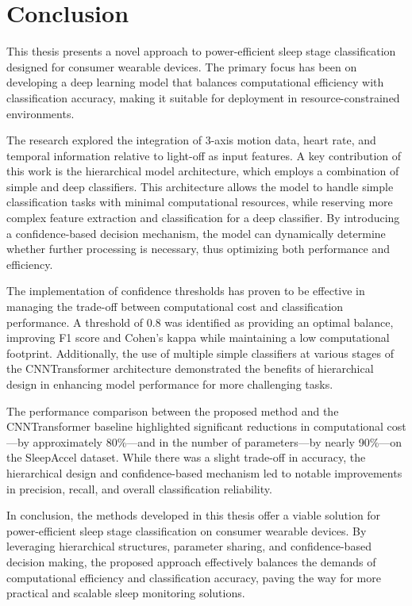 \chapter{Conclusion}

\hspace{2em}This thesis presents a novel approach to power-efficient sleep stage classification designed for consumer wearable devices. The primary focus has been on developing a deep learning model that balances computational efficiency with classification accuracy, making it suitable for deployment in resource-constrained environments.

The research explored the integration of 3-axis motion data, heart rate, and temporal information relative to light-off as input features. A key contribution of this work is the hierarchical model architecture, which employs a combination of simple and deep classifiers. This architecture allows the model to handle simple classification tasks with minimal computational resources, while reserving more complex feature extraction and classification for a deep classifier. By introducing a confidence-based decision mechanism, the model can dynamically determine whether further processing is necessary, thus optimizing both performance and efficiency.

The implementation of confidence thresholds has proven to be effective in managing the trade-off between computational cost and classification performance. A threshold of 0.8 was identified as providing an optimal balance, improving F1 score and Cohen's kappa while maintaining a low computational footprint. Additionally, the use of multiple simple classifiers at various stages of the CNNTransformer architecture demonstrated the benefits of hierarchical design in enhancing model performance for more challenging tasks.

The performance comparison between the proposed method and the CNNTransformer baseline highlighted significant reductions in computational cost—by approximately 80\%—and in the number of parameters—by nearly 90\%—on the SleepAccel dataset. While there was a slight trade-off in accuracy, the hierarchical design and confidence-based mechanism led to notable improvements in precision, recall, and overall classification reliability.

In conclusion, the methods developed in this thesis offer a viable solution for power-efficient sleep stage classification on consumer wearable devices. By leveraging hierarchical structures, parameter sharing, and confidence-based decision making, the proposed approach effectively balances the demands of computational efficiency and classification accuracy, paving the way for more practical and scalable sleep monitoring solutions.
